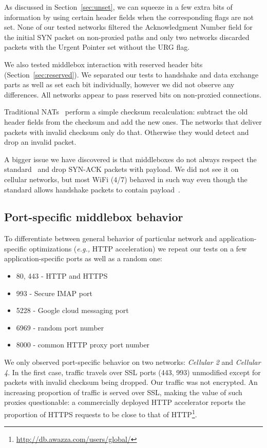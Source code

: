 \documentclass{sig-alternate-10pt}
\providecommand{\eg}{\emph{e.g.,} }
\begin{document}
As discussed in Section~\ref{sec:unset}, we can squeeze in a few extra bits of information by using certain header fields when the corresponding flags are not set. None of our tested networks filtered the Acknowledgment Number field for the initial SYN packet on non-proxied paths and only two networks discarded packets with the Urgent Pointer set without the URG flag.

We also tested middlebox interaction with reserved header bits (Section~\ref{sec:reserved}). We separated our tests to handshake and data exchange parts as well as set each bit individually, however we did not observe any differences. All networks appear to pass reserved bits on non-proxied connections.

Traditional NATs~\cite{Egevang:tu} perform a simple checksum recalculation: subtract the old header fields from the checksum and add the new ones. The networks that deliver packets with invalid checksum only do that. Otherwise they would detect and drop an invalid packet.

A bigger issue we have discovered is that middleboxes do not always respect the standard~\cite{Postel:3EDyoxP_} and drop SYN-ACK packets with payload. We did not see it on cellular networks, but most WiFi (4/7) behaved in such way even though the standard allows handshake packets to contain payload~\cite{Postel:3EDyoxP_,Chu:2011tn}.

\subsection{Port-specific middlebox behavior}
\label{sec:portspec}

To differentiate between general behavior of particular network and application-specific optimizations (\eg HTTP acceleration) we repeat our tests on a few application-specific ports as well as a random one:
\begin{itemize}
    \item 80, 443 - HTTP and HTTPS
    \item 993 - Secure IMAP port
    \item 5228 - Google cloud messaging port
    \item 6969 - random port number
    \item 8000 - common HTTP proxy port number
\end{itemize}

We only observed port-specific behavior on two networks: \emph{Cellular 2} and \emph{Cellular 4}. In the first case, traffic travels over SSL ports (443, 993) unmodified except for packets with invalid checksum being dropped. Our traffic was not encrypted. An increasing proportion of traffic is served over SSL, making the value of such proxies questionable: a commercially deployed HTTP accelerator reports the proportion of HTTPS requests to be close to that of HTTP\footnote{\url{http://db.awazza.com/users/global/}}.
\end{document}
